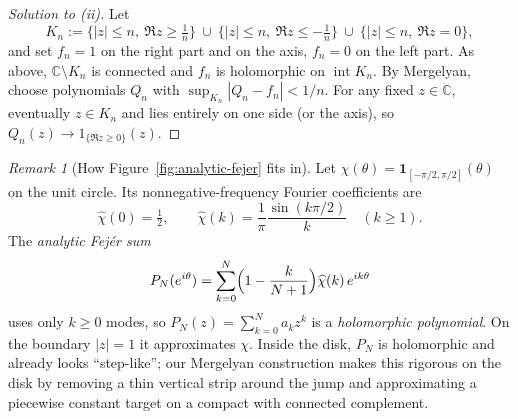 \documentclass[11pt,a4paper]{article}
\theoremstyle{definition}
\theoremstyle{definition}
\theoremstyle{plain}
\theoremstyle{remark}
\newtheorem{remark}[exercise]{Remark}
\begin{document}
\begin{proof}[Solution to (ii)]
	Let
	\[
	K_n:=\bigl\{|z|\le n,\ \Re z\ge \tfrac1n\bigr\}
	\ \cup\ \bigl\{|z|\le n,\ \Re z\le -\tfrac1n\bigr\}
	\ \cup\ \bigl\{|z|\le n,\ \Re z=0\bigr\},
	\]
	and set $f_n=1$ on the right part and on the axis, $f_n=0$ on the left part.
	As above, $\mathbb C\setminus K_n$ is connected and $f_n$ is holomorphic on
	$\operatorname{int}K_n$. By Mergelyan, choose polynomials $Q_n$ with
	$\sup_{K_n}|Q_n-f_n|<1/n$. For any fixed $z\in\mathbb C$, eventually $z\in K_n$ and
	lies entirely on one side (or the axis), so $Q_n(z)\to 1_{\{\Re z\ge0\}}(z)$.
\end{proof}

\begin{remark}[How Figure~\ref{fig:analytic-fejer} fits in]
	Let $\chi(\theta)=\mathbf 1_{[-\pi/2,\pi/2]}(\theta)$ on the unit circle.
	Its nonnegative-frequency Fourier coefficients are
	\[
	\widehat\chi(0)=\tfrac12,\qquad
	\widehat\chi(k)=\frac{1}{\pi}\frac{\sin(k\pi/2)}{k}\quad(k\ge1).
	\]
	The \emph{analytic Fejér sum}
	\[
	P_N(e^{i\theta})=\sum_{k=0}^N\Bigl(1-\frac{k}{N+1}\Bigr)\widehat\chi(k)\,e^{ik\theta}
	\]
	uses only $k\ge0$ modes, so $P_N(z)=\sum_{k=0}^N a_k z^k$ is a \emph{holomorphic polynomial}.
	On the boundary $|z|=1$ it approximates $\chi$. Inside the disk, $P_N$ is holomorphic and
	already looks “step-like”; our Mergelyan construction makes this rigorous on the disk by
	removing a thin vertical strip around the jump and approximating a piecewise constant target
	on a compact with connected complement.
\end{remark}

\end{document}
